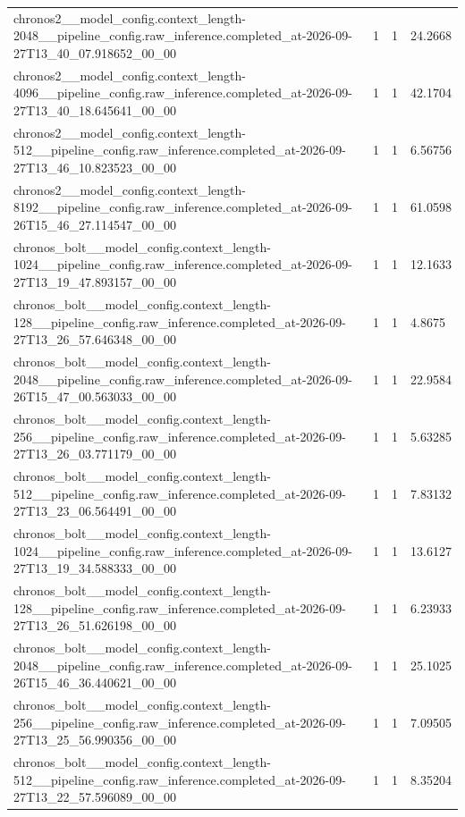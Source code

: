 \begin{tabular}{llll}
chronos2\_\_model\_config.context\_length-2048\_\_pipeline\_config.raw\_inference.completed\_at-2026-09-27T13\_40\_07.918652\_00\_00 & 1 & 1 & 24.2668 \\
chronos2\_\_model\_config.context\_length-4096\_\_pipeline\_config.raw\_inference.completed\_at-2026-09-27T13\_40\_18.645641\_00\_00 & 1 & 1 & 42.1704 \\
chronos2\_\_model\_config.context\_length-512\_\_pipeline\_config.raw\_inference.completed\_at-2026-09-27T13\_46\_10.823523\_00\_00 & 1 & 1 & 6.56756 \\
chronos2\_\_model\_config.context\_length-8192\_\_pipeline\_config.raw\_inference.completed\_at-2026-09-26T15\_46\_27.114547\_00\_00 & 1 & 1 & 61.0598 \\
chronos\_bolt\_\_model\_config.context\_length-1024\_\_pipeline\_config.raw\_inference.completed\_at-2026-09-27T13\_19\_47.893157\_00\_00 & 1 & 1 & 12.1633 \\
chronos\_bolt\_\_model\_config.context\_length-128\_\_pipeline\_config.raw\_inference.completed\_at-2026-09-27T13\_26\_57.646348\_00\_00 & 1 & 1 & 4.8675 \\
chronos\_bolt\_\_model\_config.context\_length-2048\_\_pipeline\_config.raw\_inference.completed\_at-2026-09-26T15\_47\_00.563033\_00\_00 & 1 & 1 & 22.9584 \\
chronos\_bolt\_\_model\_config.context\_length-256\_\_pipeline\_config.raw\_inference.completed\_at-2026-09-27T13\_26\_03.771179\_00\_00 & 1 & 1 & 5.63285 \\
chronos\_bolt\_\_model\_config.context\_length-512\_\_pipeline\_config.raw\_inference.completed\_at-2026-09-27T13\_23\_06.564491\_00\_00 & 1 & 1 & 7.83132 \\
chronos\_bolt\_\_model\_config.context\_length-1024\_\_pipeline\_config.raw\_inference.completed\_at-2026-09-27T13\_19\_34.588333\_00\_00 & 1 & 1 & 13.6127 \\
chronos\_bolt\_\_model\_config.context\_length-128\_\_pipeline\_config.raw\_inference.completed\_at-2026-09-27T13\_26\_51.626198\_00\_00 & 1 & 1 & 6.23933 \\
chronos\_bolt\_\_model\_config.context\_length-2048\_\_pipeline\_config.raw\_inference.completed\_at-2026-09-26T15\_46\_36.440621\_00\_00 & 1 & 1 & 25.1025 \\
chronos\_bolt\_\_model\_config.context\_length-256\_\_pipeline\_config.raw\_inference.completed\_at-2026-09-27T13\_25\_56.990356\_00\_00 & 1 & 1 & 7.09505 \\
chronos\_bolt\_\_model\_config.context\_length-512\_\_pipeline\_config.raw\_inference.completed\_at-2026-09-27T13\_22\_57.596089\_00\_00 & 1 & 1 & 8.35204 \\

\end{tabular}
